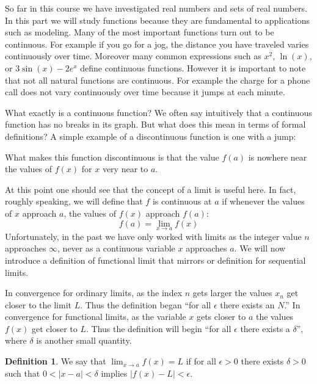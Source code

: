 \documentclass[11pt,oneside]{amsbook}
\theoremstyle{definition}
\theoremstyle{plain}
\theoremstyle{definition}
\newtheorem{definition}[theorem]{Definition}
\theoremstyle{remark}
\numberwithin{equation}{section}
\numberwithin{figure}{section}
\begin{document}
So far in this course we have investigated real numbers and sets of real numbers. In this part we will study functions because they are fundamental to applications such as modeling. Many of the most important functions turn out to be continuous. For example if you go for a jog, the distance you have traveled varies continuously over time. Moreover many common expressions such as $x^2$, $\ln(x)$, or $3\sin(x)-2e^x$ define continuous functions. However it is important to note that not all natural functions are continuous. For example the charge for a phone call does not vary continuously over time because it jumps at each minute.

What exactly is a continuous function? We often say intuitively that a continuous function has no breaks in its graph. But what does this mean in terms of formal definitions? A simple example of a discontinuous function is one with a jump:
\begin{center}
\end{center}
What makes this function discontinuous is that the value $f(a)$ is nowhere near the values of $f(x)$ for $x$ very near to $a$.

At this point one should see that the concept of a limit is useful here. In fact, roughly speaking, we will define that $f$ is continuous at $a$ if whenever the values of $x$ approach $a$, the values of $f(x)$ approach $f(a)$:
\[f(a)=\lim_{x\to a}f(x)
\]
Unfortunately, in the past we have only worked with limits as the integer value $n$ approaches $\infty$, never as a continuous variable $x$ approaches $a$. We will now introduce a definition of functional limit that mirrors or definition for sequential limits.

In convergence for ordinary limits, as the index $n$ gets larger the values $x_n$ get closer to the limit $L$. Thus the definition began ``for all $\epsilon$ there exists an $N$.'' In convergence for functional limits, as the variable $x$ gets closer to $a$ the values $f(x)$ get closer to $L$. Thus the definition will begin ``for all $\epsilon$ there exists a $\delta$'', where $\delta$ is another small quantity.

\begin{definition}
  We say that $\lim_{x\to a}f(x)=L$ if for all $\epsilon>0$ there exists $\delta>0$ such that $0<|x-a|<\delta$ implies $|f(x)-L|<\epsilon$.
\end{definition}
\end{document}
